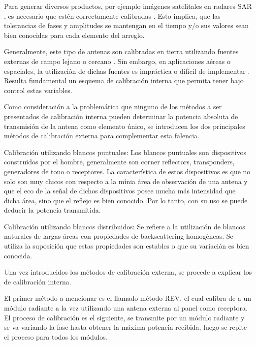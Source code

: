 Para generar diversos productos, por ejemplo imágenes satelitales en radares SAR \cite{Freeman1992}, es necesario que estén 
correctamente calibradas \cite{Luscombe1990}\cite{Seifert1996}\cite{Dall1994}. Esto implica, que las tolerancias de fases y
amplitudes se mantengan en el tiempo y/o sus valores sean bien conocidas para cada elemento del arreglo.

Generalmente, este tipo de antenas son calibradas en tierra utilizando fuentes 
externas de campo lejano o cercano \cite{Agrawal2003}. Sin embargo, en 
aplicaciones aéreas o espaciales, la utilización de dichas fuentes es impráctica
o difícil de implementar \cite{Aumann1989}. Resulta fundamental un esquema de
calibración interna que permita tener bajo control estas variables. 

Como consideración a la problemática que ninguno de los métodos a ser presentados de calibración interna pueden determinar
la potencia absoluta de transmisión de la antena como elemento único, se introducen los dos principales métodos de 
calibración externa para complementar esta falencia. 

Calibración utilizando blancos puntuales: Los blancos puntuales son dispositivos construidos por el hombre, generalmente son
corner reflectors, transponders, generadores de tono o receptores. La característica de estos dispositivos es que no solo 
son muy chicos con respecto a la mínia área de observación de una antena y que el eco de la señal de dichos dispositivos 
posee mucha más intensidad que dicha área, sino que el reflejo es bien conocido. Por lo tanto, con su uso se puede deducir la potencia transmitida.

Calibración utilizando blancos distribuidos: Se refiere a la utilización de blancos naturales de largas áreas con 
propiedades de backscattering homogéneas. Se utiliza la suposición que estas propiedades son estables o que su variación es 
bien conocida.

Una vez introducidos los métodos de calibración externa, se procede a explicar los de calibración interna.

El primer método a mencionar es el llamado método REV, el cual calibra de a un módulo radiante a la vez utilizando una 
antena externa al panel como receptora. El proceso de calibración es el siguiente, se transmite por un módulo radiante
y se va variando la fase hasta obtener la máxima potencia recibida, luego se repite el proceso para todos los módulos. 

